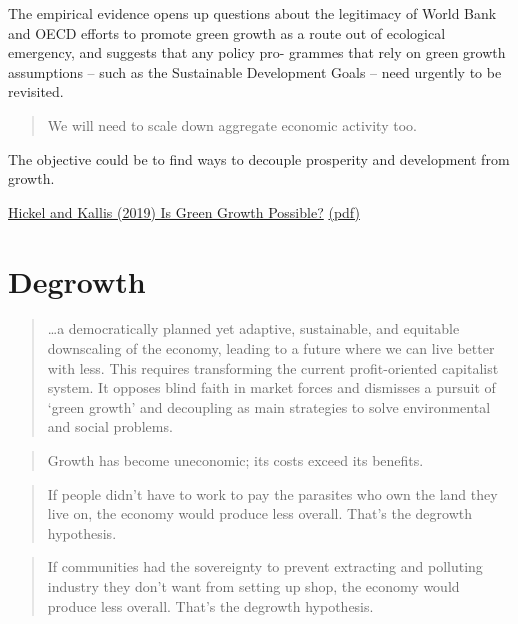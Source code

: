 \documentclass[
]{book}
\begin{document}
The empirical evidence opens up questions about the legitimacy of World Bank and OECD efforts
to promote green growth as a route out of ecological emergency, and suggests that any policy pro-
grammes that rely on green growth assumptions -- such as the Sustainable Development Goals --
need urgently to be revisited.

\begin{quote}
We will need to scale down aggregate economic activity too.
\end{quote}

The objective could be to find ways to decouple prosperity and development from growth.

\href{https://doi.org/10.1080/13563467.2019.1598964}{Hickel and Kallis (2019) Is Green Growth Possible?}
\href{pdf/Hickel_and_Kallis_2019_Is_Green_Growth_Possible.pdf}{(pdf)}

\hypertarget{degrowth}{%
\chapter{Degrowth}\label{degrowth}}

\begin{quote}
\ldots a democratically planned yet adaptive, sustainable, and equitable downscaling of the
economy, leading to a future where we can live better with less. This requires transforming the
current profit-oriented capitalist system. It opposes blind faith in market forces and dismisses a
pursuit of `green growth' and decoupling as main strategies to solve environmental and social
problems.
\end{quote}

\begin{quote}
Growth has become uneconomic; its costs exceed its benefits.
\end{quote}

\begin{quote}
If people didn't have to work to pay the parasites who own the land they live on, the economy would produce less overall. That's the degrowth hypothesis.
\end{quote}

\begin{quote}
If communities had the sovereignty to prevent extracting and polluting industry they don't want from
setting up shop, the economy would produce less overall. That's the degrowth hypothesis.
\end{quote}
\end{document}
